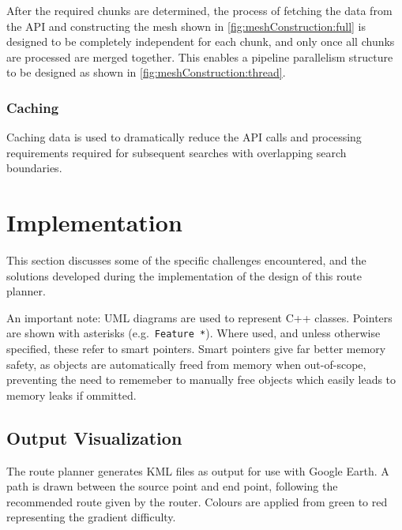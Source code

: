 \documentclass[12pt]{article}
\begin{document}
After the required chunks are determined, the process of fetching the data from the API and constructing the mesh shown in \autoref{fig:meshConstruction:full} is designed to be completely independent for each chunk, and only once all chunks are processed are merged together. This enables a pipeline parallelism structure to be designed as shown in \autoref{fig:meshConstruction:thread}.

\subsubsection{Caching}

Caching data is used to dramatically reduce the API calls and processing requirements required for subsequent searches with overlapping search boundaries.


\section{Implementation}

This section discusses some of the specific challenges encountered, and the solutions developed during the implementation of the design of this route planner.

An important note: UML diagrams are used to represent C++ classes. Pointers are shown with asterisks (e.g.\ \texttt{Feature *}). Where used, and unless otherwise specified, these refer to smart pointers. Smart pointers give far better memory safety, as objects are automatically freed from memory when out-of-scope, preventing the need to rememeber to manually free objects which easily leads to memory leaks if ommitted.



\subsection{Output Visualization}

The route planner generates KML files as output for use with Google Earth. A path is drawn between the source point and end point, following the recommended route given by the router. Colours are applied from green to red representing the gradient difficulty.
\end{document}
